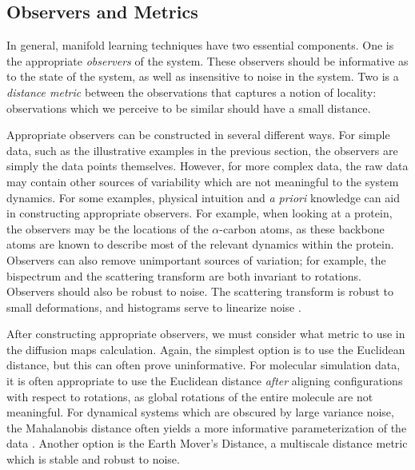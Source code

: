 \documentclass[preprint]{elsarticle}
\begin{document}
\subsection{Observers and Metrics}

In general, manifold learning techniques have two essential components.
%
One is the appropriate {\em observers} of the system. 
%
These observers should be informative as to the state of the system, as well as insensitive to noise in the system. 
%
Two is a {\em distance metric} between the observations that captures a notion of locality: observations which we perceive to be similar should have a small distance. 
%


Appropriate observers can be constructed in several different ways. 
%
For simple data, such as the illustrative examples in the previous section, the observers are simply the data points themselves. 
%
However, for more complex data, the raw data may contain other sources of variability which are not meaningful to the system dynamics. 
%
For some examples, physical intuition and {\em a priori} knowledge can aid in constructing appropriate observers. 
%
For example, when looking at a protein, the observers may be the locations of the $\alpha$-carbon atoms, as these backbone atoms are known to describe most of the relevant dynamics within the protein. 
%
Observers can also remove unimportant sources of variation; 
for example, the bispectrum \cite{zhao2014rotationally} and the scattering transform \cite{mallat2012group} are both invariant to rotations. 
%
Observers should also be robust to noise. 
%
The scattering transform \cite{mallat2012group} is robust to small deformations, and histograms serve to linearize noise \cite{talmon2013empirical}.

After constructing appropriate observers, we must consider what metric to use in the diffusion maps calculation. 
%
Again, the simplest option is to use the Euclidean distance, but this can often prove uninformative. 
%
For molecular simulation data, it is often appropriate to use the Euclidean distance {\em after} aligning configurations with respect to rotations, as global rotations of the entire molecule are not meaningful.
%
For dynamical systems which are obscured by large variance noise, the Mahalanobis distance often yields a more informative parameterization of the data \cite{talmon2013empirical}.
%
Another option is the Earth Mover's Distance, a multiscale distance metric which is stable and robust to noise.
\end{document}
